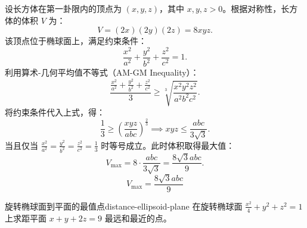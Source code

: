 \begin{solution}
    设长方体在第一卦限内的顶点为 $(x, y, z)$，其中 $x, y, z > 0$。根据对称性，长方体的体积 $V$ 为：
    \begin{equation}
        V = (2x)(2y)(2z) = 8xyz.
    \end{equation}
    该顶点位于椭球面上，满足约束条件：
    \begin{equation}
        \frac{x^2}{a^2} + \frac{y^2}{b^2} + \frac{z^2}{c^2} = 1.
    \end{equation}
    利用算术-几何平均值不等式（AM-GM Inequality）：
    \begin{equation}
        \frac{\frac{x^2}{a^2} + \frac{y^2}{b^2} + \frac{z^2}{c^2}}{3} \ge \sqrt[3]{\frac{x^2 y^2 z^2}{a^2 b^2 c^2}}.
    \end{equation}
    将约束条件代入上式，得：
    \begin{equation}
        \frac{1}{3} \ge \left( \frac{xyz}{abc} \right)^{\frac{2}{3}} \implies xyz \le \frac{abc}{3\sqrt{3}}.
    \end{equation}
    当且仅当 $\frac{x^2}{a^2} = \frac{y^2}{b^2} = \frac{z^2}{c^2} = \frac{1}{3}$ 时等号成立。此时体积取得最大值：
    \begin{equation}
        V_{\max} = 8 \cdot \frac{abc}{3\sqrt{3}} = \frac{8\sqrt{3} abc}{9}.
    \end{equation}
    \begin{equation}
        \boxed{V_{\max} = \frac{8\sqrt{3} abc}{9}}
    \end{equation}
\end{solution}


\begin{problem}{旋转椭球面到平面的最值点}{distance-ellipsoid-plane}
    在旋转椭球面 $\frac{x^2}{4} + y^2 + z^2 = 1$ 上求距平面 $x + y + 2z = 9$ 最远和最近的点。
\end{problem}

